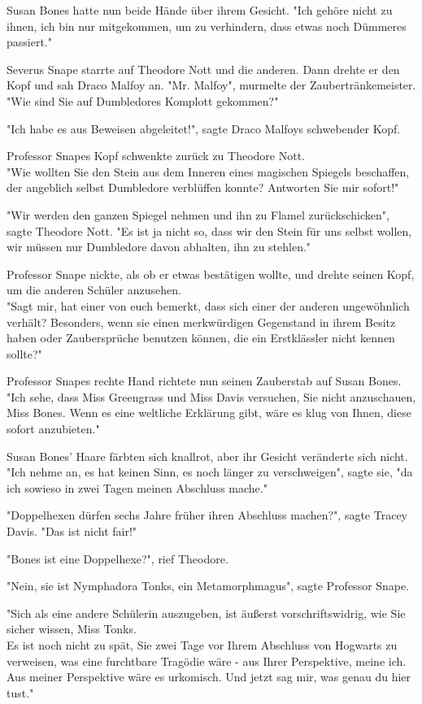 {Susan Bones hatte nun beide Hände über ihrem Gesicht. "Ich gehöre nicht zu ihnen, ich bin nur mitgekommen, um zu verhindern, dass etwas noch Dümmeres passiert."

Severus Snape starrte auf Theodore Nott und die anderen. Dann drehte er den Kopf und sah Draco Malfoy an. "Mr. Malfoy", murmelte der Zaubertränkemeister.\\ "Wie sind Sie auf Dumbledores Komplott gekommen?"

"Ich habe es aus Beweisen abgeleitet!", sagte Draco Malfoys schwebender Kopf.

Professor Snapes Kopf schwenkte zurück zu Theodore Nott.\\ "Wie wollten Sie den Stein aus dem Inneren eines magischen Spiegels beschaffen, der angeblich selbst Dumbledore verblüffen konnte? Antworten Sie mir sofort!"

"Wir werden den ganzen Spiegel nehmen und ihn zu Flamel zurückschicken", sagte Theodore Nott. "Es ist ja nicht so, dass wir den Stein für uns selbst wollen, wir müssen nur Dumbledore davon abhalten, ihn zu stehlen."

Professor Snape nickte, als ob er etwas bestätigen wollte, und drehte seinen Kopf, um die anderen Schüler anzusehen.\\ "Sagt mir, hat einer von euch bemerkt, dass sich einer der anderen ungewöhnlich verhält? Besonders, wenn sie einen merkwürdigen Gegenstand in ihrem Besitz haben oder Zaubersprüche benutzen können, die ein Erstklässler nicht kennen sollte?"

Professor Snapes rechte Hand richtete nun seinen Zauberstab auf Susan Bones.\\ "Ich sehe, dass Miss Greengrass und Miss Davis versuchen, Sie nicht anzuschauen, Miss Bones. Wenn es eine weltliche Erklärung gibt, wäre es klug von Ihnen, diese sofort anzubieten."

Susan Bones' Haare färbten sich knallrot, aber ihr Gesicht veränderte sich nicht.\\ "Ich nehme an, es hat keinen Sinn, es noch länger zu verschweigen", sagte sie, "da ich sowieso in zwei Tagen meinen Abschluss mache."

"Doppelhexen dürfen sechs Jahre früher ihren Abschluss machen?", sagte Tracey Davis. "Das ist nicht fair!"

"Bones ist eine Doppelhexe?", rief Theodore.

"Nein, sie ist Nymphadora Tonks, ein Metamorphmagus", sagte Professor Snape.

"Sich als eine andere Schülerin auszugeben, ist äußerst vorschriftswidrig, wie Sie sicher wissen, Miss Tonks.\\ Es ist noch nicht zu spät, Sie zwei Tage vor Ihrem Abschluss von Hogwarts zu verweisen, was eine furchtbare Tragödie wäre - aus Ihrer Perspektive, meine ich.\\ Aus meiner Perspektive wäre es urkomisch. Und jetzt sag mir, was genau du hier tust."

}
